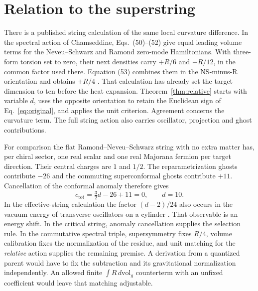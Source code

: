 \documentclass[aps,prd,reprint,onecolumn,nofootinbib,amsmath,amssymb]{revtex4-2}
\newcommand{\dv}{\,d\mathrm{vol}_g}
\begin{document}
\section{Relation to the superstring}

There is a published string calculation of the same local curvature
difference. In the spectral action of Chamseddine, Eqs.~(50)--(52)
give equal leading volume terms for the Neveu--Schwarz and Ramond zero-mode
Hamiltonians. With three-form torsion set to zero, their next densities
carry \(+R/6\) and \(-R/12\), in the common factor used there. Equation
(53) combines them in the NS-minus-R orientation and obtains \(+R/4\)
\cite{ChamseddineSuperstring1997}. That calculation has already set the
target dimension to ten before the heat expansion. Theorem~\ref{thm:relative}
starts with variable \(d\), uses the opposite orientation to retain the
Euclidean sign of Eq.~\eqref{eq:original}, and applies the unit criterion.
Agreement concerns the curvature term. The full string action also carries
oscillator, projection and ghost contributions.

For comparison the flat Ramond--Neveu--Schwarz string with no extra matter
has, per chiral sector, one real scalar and one real Majorana fermion per
target direction. Their central charges are \(1\) and \(1/2\). The
reparametrization ghosts contribute \(-26\) and the commuting
superconformal ghosts contribute \(+11\). Cancellation of the conformal
anomaly therefore gives \cite{FriedanMartinecShenker1986}
\begin{equation}
 c_{\mathrm{tot}}=\tfrac32 d-26+11=0,\qquad d=10 .
\end{equation}
In the effective-string calculation the factor \((d-2)/24\) also occurs in
the vacuum energy of transverse oscillators on a cylinder
\cite{QCDStringCasimir}. That observable is an energy shift. In the
critical string, anomaly cancellation supplies the selection rule. In the
commutative spectral triple, supersymmetry fixes \(R/4\), volume calibration
fixes the normalization of the residue, and unit matching for the
\emph{relative} action supplies the remaining premise. A derivation from a
quantized parent would have to fix the subtraction and its gravitational
normalization independently. An allowed finite \(\int R\dv\) counterterm
with an unfixed coefficient would leave that matching adjustable.


\end{document}
